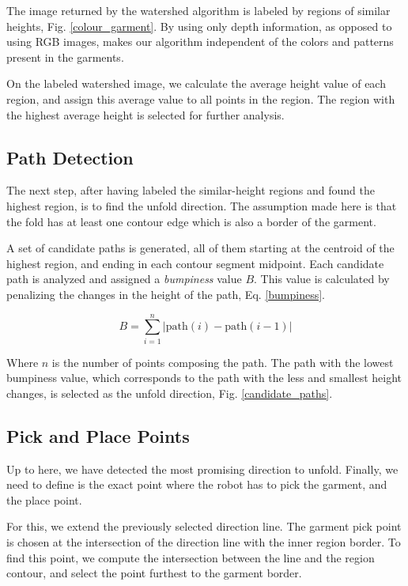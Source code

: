 The image returned by the watershed algorithm is labeled by regions of similar heights, Fig. \ref{colour_garment}. By using only depth information, as opposed to using RGB images, makes our algorithm independent of the colors and patterns present in the garments.

On the labeled watershed image, we calculate the average height value of each region, and assign this average value to all points in the region. The region with the highest average height is selected for further analysis. 

\subsection{Path Detection}
The next step, after having labeled the similar-height regions and found the highest region, is to find the unfold direction. The assumption made here is that the fold has at least one contour edge which is also a border of the garment. 

A set of candidate paths is generated, all of them starting at the centroid of the highest region, and ending in each contour segment midpoint. Each candidate path is analyzed and assigned a \textit{bumpiness} value $B$. This value is calculated by penalizing the changes in the height of the path, Eq. \eqref{bumpiness}.

\begin{equation}\label{bumpiness}
B = \sum_{i=1}^{n} | \textrm{path}(i)- \textrm{path}(i-1) | 
\end{equation}

Where $n$ is the number of points composing the path. The path with the lowest bumpiness value, which corresponds to the path with the less and smallest height changes, is selected as the unfold direction, Fig. \ref{candidate_paths}.


\subsection{Pick and Place Points}
Up to here, we have detected the most promising direction to unfold. Finally, we need to define is the exact point where the robot has to pick the garment, and the place point. 

For this, we extend the previously selected direction line. The garment pick point is chosen at the intersection of the direction line with the inner region border. To find this point, we compute the intersection between the line and the region contour, and select the point furthest to the garment border.

